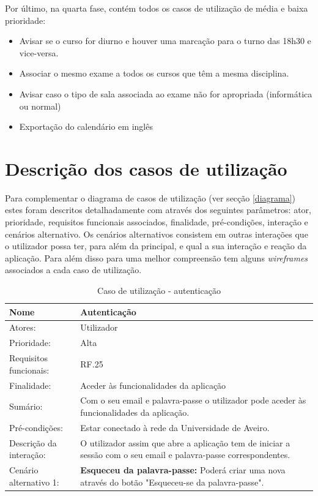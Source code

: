 \documentclass[11pt, twoside]{report}
\begin{document}
	Por último, na quarta fase, contém todos os casos de utilização de média e baixa prioridade:
	\begin{itemize}
		\item Avisar se o curso for diurno e houver uma marcação para o turno das 18h30 e vice-versa.
		\item Associar o mesmo exame a todos os cursos que têm a mesma disciplina.
		\item Avisar caso o tipo de sala associada ao exame não for apropriada (informática ou normal)
		\item Exportação do calendário em inglês
	\end{itemize}

	
	\section{Descrição dos casos de utilização}
	\label{descricaousecase}
	
	Para complementar o diagrama de casos de utilização (ver secção \ref{diagrama}) estes foram descritos detalhadamente com através dos seguintes parâmetros: ator, prioridade, requisitos funcionais associados, finalidade, pré-condições, interação e cenários alternativo.
	Os cenários alternativos consistem em outras interações que o utilizador possa ter, para além da principal, e qual a sua interação e reação da aplicação.
	Para além disso para uma melhor compreensão tem alguns \textit{wireframes} associados a cada caso de utilização.
	
	\def\arraystretch{1.5}
	\begin{table}[H]
		\caption{Caso de utilização - autenticação}
		\begin{center}	
			\begin{tabularx}{\textwidth}{|l|X|}
				\hline
				\textbf{Nome }	& \textbf{Autenticação} \\
				\hline
				Atores: & Utilizador \\
				\hline
				Prioridade: & Alta \\
				\hline
				Requisitos funcionais:& RF.25\\
				\hline
				Finalidade: & Aceder às funcionalidades da aplicação\\
				\hline
				Sumário: & Com o seu email e palavra-passe o utilizador pode aceder às funcionalidades da aplicação.\\
				\hline
				Pré-condições: & Estar conectado à rede da Universidade de Aveiro.\\
				\hline
				Descrição da interação: &  O utilizador assim que abre a aplicação tem de iniciar a sessão com o seu email e palavra-passe correspondentes.\\
				\hline
				Cenário alternativo 1:& \textbf{Esqueceu da palavra-passe:} Poderá criar uma nova através do botão "Esqueceu-se da palavra-passe".\\
				\hline
			\end{tabularx}
		\end{center}
	\end{table}
\end{document}
